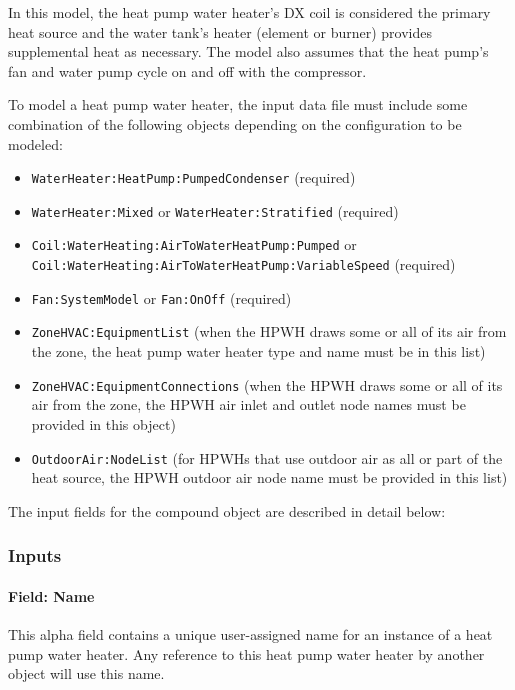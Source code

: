 In this model, the heat pump water heater's DX coil is considered the primary heat source and the water tank's heater (element or burner) provides supplemental heat as necessary. The model also assumes that the heat pump's fan and water pump cycle on and off with the compressor.

To model a heat pump water heater, the input data file must include some combination of the following objects depending on the configuration to be modeled:

\begin{itemize}
\item
  \lstinline!WaterHeater:HeatPump:PumpedCondenser! (required)
\item
  \lstinline!WaterHeater:Mixed! or \lstinline!WaterHeater:Stratified! (required)
\item
  \lstinline!Coil:WaterHeating:AirToWaterHeatPump:Pumped! or \lstinline!Coil:WaterHeating:AirToWaterHeatPump:VariableSpeed! (required)
\item
  \lstinline!Fan:SystemModel! or \lstinline!Fan:OnOff! (required)
\item
  \lstinline!ZoneHVAC:EquipmentList! (when the HPWH draws some or all of its air from the zone, the heat pump water heater type and name must be in this list)
\item
  \lstinline!ZoneHVAC:EquipmentConnections! (when the HPWH draws some or all of its air from the zone, the HPWH air inlet and outlet node names must be provided in this object)
\item
  \lstinline!OutdoorAir:NodeList! (for HPWHs that use outdoor air as all or part of the heat source, the HPWH outdoor air node name must be provided in this list)
\end{itemize}

The input fields for the compound object are described in detail below:

\subsubsection{Inputs}\label{inputs-3-040}

\paragraph{Field: Name}\label{field-name-2-042}

This alpha field contains a unique user-assigned name for an instance of a heat pump water heater. Any reference to this heat pump water heater by another object will use this name.

